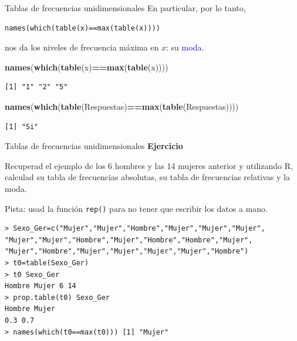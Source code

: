 \documentclass[
  ignorenonframetext,
]{beamer}
\newenvironment{Shaded}{\begin{snugshade}}{\end{snugshade}}
\newcommand{\FunctionTok}[1]{\textcolor[rgb]{0.13,0.29,0.53}{\textbf{#1}}}
\newcommand{\NormalTok}[1]{#1}
\newcommand{\SpecialCharTok}[1]{\textcolor[rgb]{0.81,0.36,0.00}{\textbf{#1}}}
\newcommand\blue[1]{\textcolor{blue}{#1}}
\begin{document}
\begin{frame}[fragile]{Tablas de frecuencias unidimensionales}
\label{tablas-de-frecuencias-unidimensionales-13}
En particular, por lo tanto,

\begin{verbatim}
names(which(table(x)==max(table(x))))
\end{verbatim}

nos da los niveles de frecuencia máxima en \(x\): su \blue{moda}.

\begin{Shaded}
\begin{Highlighting}[]
\FunctionTok{names}\NormalTok{(}\FunctionTok{which}\NormalTok{(}\FunctionTok{table}\NormalTok{(x)}\SpecialCharTok{==}\FunctionTok{max}\NormalTok{(}\FunctionTok{table}\NormalTok{(x))))}
\end{Highlighting}
\end{Shaded}

\begin{verbatim}
[1] "1" "2" "5"
\end{verbatim}

\begin{Shaded}
\begin{Highlighting}[]
\FunctionTok{names}\NormalTok{(}\FunctionTok{which}\NormalTok{(}\FunctionTok{table}\NormalTok{(Respuestas)}\SpecialCharTok{==}\FunctionTok{max}\NormalTok{(}\FunctionTok{table}\NormalTok{(Respuestas))))}
\end{Highlighting}
\end{Shaded}

\begin{verbatim}
[1] "Si"
\end{verbatim}
\end{frame}

\begin{frame}[fragile]{Tablas de frecuencias unidimensionales}
\label{tablas-de-frecuencias-unidimensionales-14}
\textbf{Ejercicio}

Recuperad el ejemplo de los 6 hombres y las 14 mujeres anterior y
utilizando R, calculad su tabla de frecuencias absolutas, su tabla de
frecuencias relativas y la moda.

Pista: usad la función \texttt{rep()} para no tener que escribir los
datos a mano.

\begin{verbatim}
> Sexo_Ger=c("Mujer","Mujer","Hombre","Mujer","Mujer","Mujer", "Mujer","Mujer","Hombre","Mujer","Hombre","Hombre","Mujer", "Mujer","Hombre","Mujer","Mujer","Mujer","Mujer","Hombre")
> t0=table(Sexo_Ger)
> t0 Sexo_Ger
Hombre Mujer 6 14
> prop.table(t0) Sexo_Ger
Hombre Mujer
0.3 0.7
> names(which(t0==max(t0))) [1] "Mujer"
\end{verbatim}
\end{frame}
\end{document}
